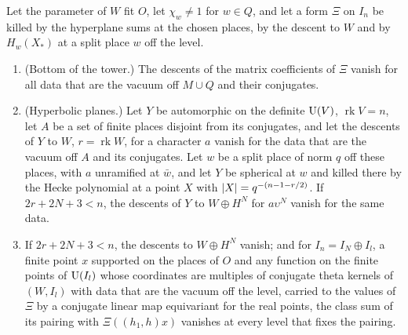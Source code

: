 \begin{theorem}\label{thm:false-lift-periods}
Let the parameter of $W$ fit $O$, let $\chi_w\ne1$ for $w\in Q$, and let a form $\Xi$ on $I_n$ be killed by the hyperplane sums at the chosen places, by the descent to $W$ and by $H_w(X_*)$ at a split place $w$ off the
level.
\begin{enumerate}[label=\textup{(\alph*)}]
\item (Bottom of the tower.) The descents of the matrix coefficients of $\Xi$ vanish for all data that are the vacuum off $M\cup Q$ and their conjugates.
\item (Hyperbolic planes.) Let $Y$ be automorphic on the definite $\operatorname{U}(V)$, $\operatorname{rk}V=n$, let $A$ be a set of finite places disjoint from its conjugates, and let the descents of $Y$ to $W$, $r=\operatorname{rk}W$,
for a character $a$ vanish for the data that are the vacuum off $A$ and its conjugates. Let $w$ be a split place of norm $q$ off these places, with $a$ unramified at $\bar w$, and let $Y$ be spherical at $w$ and
killed there by the Hecke polynomial at a point $X$ with $\lvert X\rvert=q^{-(n-1-r/2)}$. If $2r+2N+3<n$, the descents of $Y$ to $W\oplus H^N$ for $a\upsilon^N$ vanish for the same data.
\item If $2r+2N+3<n$, the descents to $W\oplus H^N$ vanish; and for $I_n=I_N\oplus I_l$, a finite point $x$ supported on the places of $O$ and any function on the finite points of $\operatorname{U}(I_l)$ whose coordinates are
multiples of conjugate theta kernels of $(W,I_l)$ with data that are the vacuum off the level, carried to the values of $\Xi$ by a conjugate linear map equivariant for the real points, the class sum of its pairing
with $\Xi((h_1,h)x)$ vanishes at every level that fixes the pairing.
\end{enumerate}
\end{theorem}

